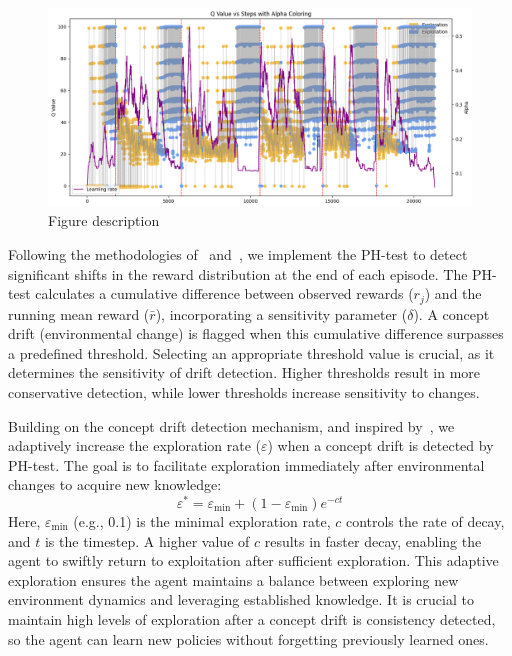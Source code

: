 \begin{figure}
    \centering
    \includegraphics[width=\textwidth]{figures/alpha.png}
    \caption{Figure description}
    \label{fig:alpha}
\end{figure}

Following the methodologies of~\citet{mignon2017adaptive} and~\citet{networkdynamicrl}, we implement the PH-test to detect significant shifts in the reward distribution at the end of each episode. The PH-test calculates a cumulative difference between observed rewards ($r_j$) and the running mean reward ($\bar{r}$), incorporating a sensitivity parameter ($\delta$). A concept drift (environmental change) is flagged when this cumulative difference surpasses a predefined threshold. Selecting an appropriate threshold value is crucial, as it determines the sensitivity of drift detection. Higher thresholds result in more conservative detection, while lower thresholds increase sensitivity to changes.

Building on the concept drift detection mechanism, and inspired by~\citet{mignon2017adaptive}, we adaptively increase the exploration rate ($\varepsilon$) when a concept drift is detected by PH-test. The goal is to facilitate exploration immediately after environmental changes to acquire new knowledge:
\begin{equation}
    \label{eq:epsilon_greedy}
    \varepsilon^* = \varepsilon_{\min} + (1-\varepsilon_{\min}) e^{-ct}
\end{equation}
Here, $\varepsilon_{\min}$ (e.g., 0.1) is the minimal exploration rate, $c$ controls the rate of decay, and $t$ is the timestep. A higher value of $c$ results in faster decay, enabling the agent to swiftly return to exploitation after sufficient exploration. This adaptive exploration ensures the agent maintains a balance between exploring new environment dynamics and leveraging established knowledge. It is crucial to maintain high levels of exploration after a concept drift is consistency detected, so the agent can learn new policies  without forgetting previously learned ones.

